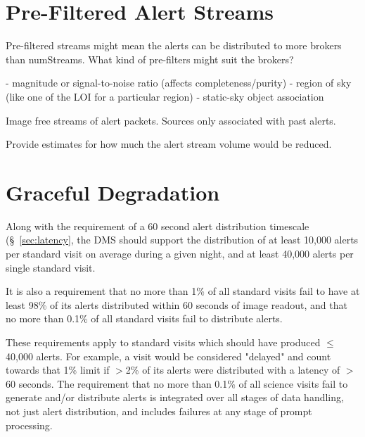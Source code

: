 \documentclass[DM,lsstdraft,authoryear,toc]{lsstdoc}
\begin{document}
\clearpage
\section{Pre-Filtered Alert Streams} \label{sec:prefilter}

Pre-filtered streams might mean the alerts can be distributed to more brokers than numStreams. What kind of pre-filters might suit the brokers?

 - magnitude or signal-to-noise ratio (affects completeness/purity)
 - region of sky (like one of the LOI for a particular region)
 - static-sky object association
 
 Image free streams of alert packets.
 Sources only associated with past alerts.

Provide estimates for how much the alert stream volume would be reduced.



\clearpage
\section{Graceful Degradation} \label{sec:graceful}

Along with the requirement of a 60 second alert distribution timescale (\S~\ref{sec:latency}, the DMS should support the distribution of at least 10,000 alerts per standard visit on average during a given night, and at least 40,000 alerts per single standard visit. 

It is also a requirement that no more than 1\% of all standard visits fail to have at least 98\% of its alerts distributed within 60 seconds of image readout, and that no more than 0.1\% of all standard visits fail to distribute alerts.

These requirements apply to standard visits which should have produced $\leq$40,000 alerts. For example, a visit would be considered "delayed" and count towards that 1\% limit if $>$2\% of its alerts were distributed with a latency of $>$60 seconds. The requirement that no more than 0.1\% of all science visits fail to generate and/or distribute alerts is integrated over all stages of data handling, not just alert distribution, and includes failures at any stage of prompt processing.
\end{document}
